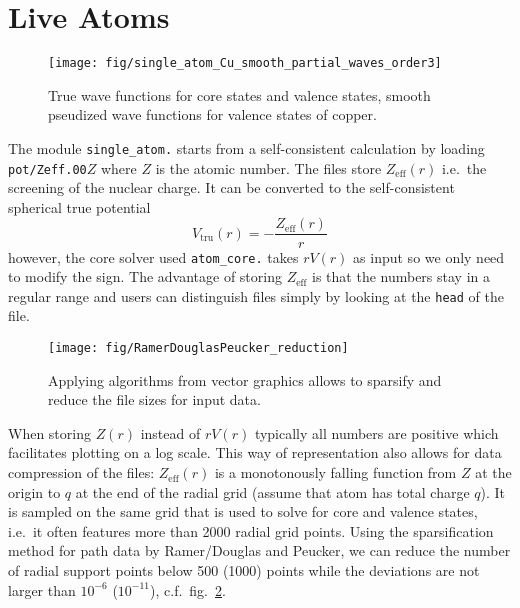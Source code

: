 \documentclass[oribibl]{llncs}
\newcommand{\um}[1]{_{\mathrm{#1}}}
\newcommand{\ttt}[1]{\texttt{#1}}
\begin{document}
\section{Live Atoms}\label{sec:live_atoms}
%
\begin{figure}
  \begin{minipage}[c]{.990\textwidth}
	\texttt{[image: fig/single\_atom\_Cu\_smooth\_partial\_waves\_order3]} %
  \end{minipage}\hfill
  \begin{minipage}[c]{.009\textwidth}
  \end{minipage}
  \label{fig:single_atom_Cu}
  \caption{
	True wave functions for core states and valence states, 
	smooth pseudized wave functions for valence states of copper.
  }
\end{figure}
%
%
The module \ttt{single\_atom.} starts from a self-consistent calculation by loading 
\ttt{pot/Zeff.00}$Z$ where $Z$ is the atomic number.
The files store $Z\um{eff}(r)$ i.e.~the screening of the nuclear charge.
It can be converted to the self-consistent spherical true potential
\begin{equation}
	V\um{tru}(r) = -\frac{Z\um{eff}(r)}{r}
\end{equation}
however, the core solver used \ttt{atom\_core.} takes $rV(r)$ as input so
we only need to modify the sign.
The advantage of storing $Z\um{eff}$ is that the numbers stay in a regular range
and users can distinguish files simply by looking at the \ttt{head} of the file.
%
\begin{figure}
  \begin{minipage}[c]{.990\textwidth}
	\texttt{[image: fig/RamerDouglasPeucker\_reduction]} %
  \end{minipage}\hfill
  \begin{minipage}[c]{.009\textwidth}
  \end{minipage}
  \label{fig:RamerDouglasPeucker_reduction}
  \caption{
	Applying algorithms from vector graphics allows to sparsify and reduce 
	the file sizes for input data.
  }
\end{figure}
%
When storing $Z(r)$ instead of $rV(r)$ typically all numbers are positive 
which facilitates plotting on a log scale.
This way of representation also allows for data compression of the files:
$Z\um{eff}(r)$ is a monotonously falling function from $Z$ at the origin to $q$ at the
end of the radial grid (assume that atom has total charge $q$).
It is sampled on the same grid that is used to solve for core and valence states,
i.e.~it often features more than 2000 radial grid points.
Using the sparsification method for path data by Ramer/Douglas and Peucker,
we can reduce the number of radial support points below 500 (1000) points while
the deviations are not larger than $10^{-6}$ ($10^{-11}$), 
c.f.~fig.~\ref{fig:RamerDouglasPeucker_reduction}.
\end{document}

